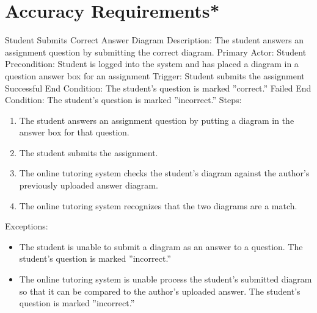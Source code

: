 
\chapter{Accuracy Requirements*}
    
    \begin{section}{Student Submits Correct Answer Diagram}
        Description: The student answers an assignment question by submitting the correct diagram. \newline
        Primary Actor: Student \newline
        Precondition: Student is logged into the system and has placed a diagram in a question answer box for an assignment \newline  
        Trigger: Student submits the assignment \newline
        Successful End Condition: The student's question is marked ''correct.'' \newline
        Failed End Condition: The student's question is marked ''incorrect.'' \newline
        \newline
        Steps:
        \begin{enumerate}
            \item{The student answers an assignment question by putting a diagram in the answer box for that question.}
            \item{The student submits the assignment.}
            \item{The online tutoring system checks the student's diagram against the author's previously uploaded answer diagram.}
            \item{The online tutoring system recognizes that the two diagrams are a match.}
        \end{enumerate}
        Exceptions:
        \begin{itemize}
            \item{The student is unable to submit a diagram as an answer to a question.  The student's question is marked ''incorrect.''}  
            \item{The online tutoring system is unable process the student's submitted diagram so that it can be 
            compared to the author's uploaded answer.  The student's question is marked ''incorrect.''}
        \end{itemize}
    \end{section}
    
